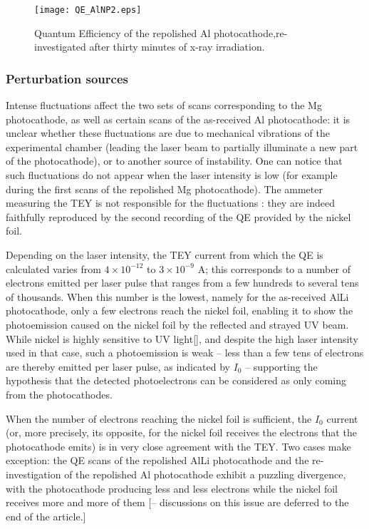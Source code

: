 \documentclass[aip,graphicx]{revtex4-1}
\begin{document}
\begin{figure}
\texttt{[image: QE\_AlNP2.eps]}%
\caption{Quantum Efficiency of the repolished Al photocathode,re-investigated after thirty minutes of x-ray irradiation.\label{QE_8}}%
\end{figure}

\subsubsection*{Perturbation sources}
Intense fluctuations affect the two sets of scans corresponding to the Mg photocathode, as well as certain scans of the as-received Al photocathode: it is unclear whether these fluctuations are due to mechanical vibrations of the experimental chamber (leading the laser beam to partially illuminate a new part of the photocathode), or to another source of instability. One can notice that such fluctuations do not appear when the laser intensity is low (for example during the first scans of the repolished Mg photocathode). The ammeter measuring the TEY is not responsible for the fluctuations : they are indeed faithfully reproduced by the second recording of the QE provided by the nickel foil.

Depending on the laser intensity, the TEY current from which the QE is calculated varies from $4\times10^{-12}$ to $3\times10^{-9}$ A; this corresponds to a number of electrons emitted per laser pulse that ranges from a few hundreds to several tens of thousands. When this number is the lowest, namely for the as-received AlLi photocathode, only a few electrons reach the nickel foil, enabling it to show the photoemission caused on the nickel foil by the reflected and strayed UV beam. While nickel is highly sensitive to UV light\ref{}, and despite the high laser intensity used in that case, such a photoemission is weak -- less than a few tens of electrons are thereby emitted per laser pulse, as indicated by $I_0$ -- supporting the hypothesis that the detected photoelectrons can be considered as only coming from the photocathodes.

When the number of electrons reaching the nickel foil is sufficient, the $I_0$ current (or, more precisely, its opposite, for the nickel foil receives the electrons that the photocathode emits) is in very close agreement with the TEY. Two cases make exception: the QE scans of the repolished AlLi photocathode and the re-investigation of the repolished Al photocathode exhibit a puzzling divergence, with the photocathode producing less and less electrons while the nickel foil receives more and more of them [-- discussions on this issue are deferred to the end of the article.]
\end{document}
